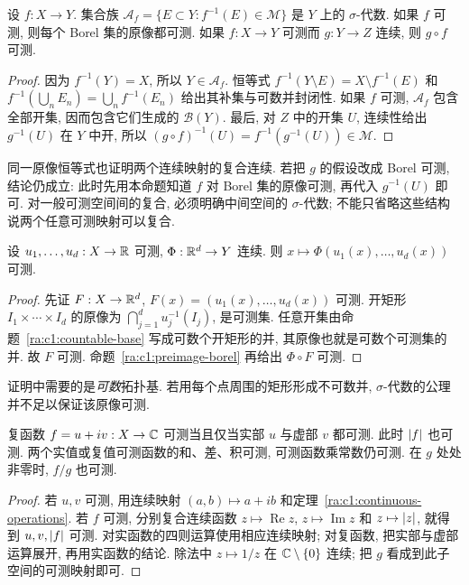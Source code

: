 \begin{proposition}\label{ra:c1:preimage-borel}
设 $f:X\to Y$. 集合族 $\mathcal A_f=\{E\subset Y:f^{-1}(E)\in\mathcal M\}$ 是 $Y$ 上的 $\sigma$-代数. 如果 $f$ 可测, 则每个 Borel 集的原像都可测. 如果 $f:X\to Y$ 可测而 $g:Y\to Z$ 连续, 则 $g\circ f$ 可测.
\end{proposition}
\begin{proof}
因为 $f^{-1}(Y)=X$, 所以 $Y\in\mathcal A_f$. 恒等式 $f^{-1}(Y\setminus E)=X\setminus f^{-1}(E)$ 和 $f^{-1}(\bigcup_n E_n)=\bigcup_n f^{-1}(E_n)$ 给出其补集与可数并封闭性. 如果 $f$ 可测, $\mathcal A_f$ 包含全部开集, 因而包含它们生成的 $\mathcal B(Y)$. 最后, 对 $Z$ 中的开集 $U$, 连续性给出 $g^{-1}(U)$ 在 $Y$ 中开, 所以 $(g\circ f)^{-1}(U)=f^{-1}(g^{-1}(U))\in\mathcal M$.
\end{proof}
同一原像恒等式也证明两个连续映射的复合连续. 若把 $g$ 的假设改成 Borel 可测, 结论仍成立: 此时先用本命题知道 $f$ 对 Borel 集的原像可测, 再代入 $g^{-1}(U)$ 即可. 对一般可测空间间的复合, 必须明确中间空间的 $\sigma$-代数; 不能只省略这些结构说两个任意可测映射可以复合.

\begin{theorem}\label{ra:c1:continuous-operations}
设 $u_1,\ldots,u_d:X\to\mathbb R$ 可测, $\Phi:\mathbb R^d\to Y$ 连续. 则 $x\mapsto\Phi(u_1(x),\ldots,u_d(x))$ 可测.
\end{theorem}
\begin{proof}
先证 $F:X\to\mathbb R^d$, $F(x)=(u_1(x),\ldots,u_d(x))$ 可测. 开矩形 $I_1\times\cdots\times I_d$ 的原像为 $\bigcap_{j=1}^{d}u_j^{-1}(I_j)$, 是可测集. 任意开集由命题~\ref{ra:c1:countable-base} 写成可数个开矩形的并, 其原像也就是可数个可测集的并. 故 $F$ 可测. 命题~\ref{ra:c1:preimage-borel} 再给出 $\Phi\circ F$ 可测.
\end{proof}
证明中需要的是\emph{可数}拓扑基. 若用每个点周围的矩形形成不可数并, $\sigma$-代数的公理并不足以保证该原像可测.

\begin{corollary}\label{ra:c1:complex}
复函数 $f=u+iv:X\to\mathbb C$ 可测当且仅当实部 $u$ 与虚部 $v$ 都可测. 此时 $\lvert f\rvert$ 也可测. 两个实值或复值可测函数的和、差、积可测, 可测函数乘常数仍可测. 在 $g$ 处处非零时, $f/g$ 也可测.
\end{corollary}
\begin{proof}
若 $u,v$ 可测, 用连续映射 $(a,b)\mapsto a+ib$ 和定理~\ref{ra:c1:continuous-operations}. 若 $f$ 可测, 分别复合连续函数 $z\mapsto\operatorname{Re}z$, $z\mapsto\operatorname{Im}z$ 和 $z\mapsto\lvert z\rvert$, 就得到 $u,v,\lvert f\rvert$ 可测. 对实函数的四则运算使用相应连续映射; 对复函数, 把实部与虚部运算展开, 再用实函数的结论. 除法中 $z\mapsto1/z$ 在 $\mathbb C\setminus\{0\}$ 连续; 把 $g$ 看成到此子空间的可测映射即可.
\end{proof}

